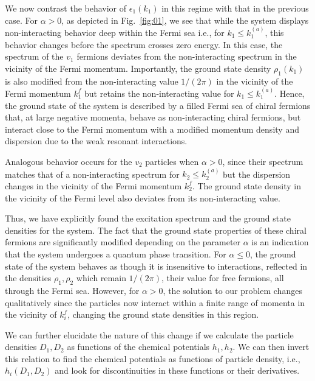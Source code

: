 \documentclass[aps,pra,
superscriptaddress,
reprint,twocolumn,preprintnumbers,
amsmath,amssymb,
nofootinbib]{revtex4-1}
\begin{document}
 
We now contrast the behavior of $\epsilon_1(k_1)$ in this regime with that in the previous case. For $\alpha>0$, as depicted in Fig.~\ref{fig:01}, we see that while the system displays non-interacting behavior deep within the Fermi sea i.e., for $k_1 \leq k_1^{(a)}$, this behavior changes before the spectrum crosses zero energy. In this case, the spectrum of the $v_1$ fermions deviates from the non-interacting spectrum in the vicinity of the Fermi momentum.
Importantly, the ground state density $\rho_1(k_1)$ is also modified from the non-interacting value $1/(2\pi)$ in the vicinity of the Fermi momentum $k_1^f$ but retains the non-interacting value for $k_1 \leq k_1^{(a)}$. Hence, the ground state of the system is described by a filled Fermi sea of chiral fermions that, at large negative momenta, behave as non-interacting chiral fermions, but interact close to the Fermi momentum with a modified momentum density and dispersion due to the weak resonant interactions.

Analogous behavior occurs for the $v_2$ particles when $\alpha > 0$, since their spectrum matches that of a non-interacting spectrum for $k_2 \leq k_2^{(a)}$ but the dispersion changes 
in the vicinity of the Fermi momentum $k_2^f$. The ground state density in the vicinity of the Fermi level also deviates from its non-interacting value.

Thus, we have explicitly found the excitation spectrum and the ground state densities for the system. The fact that the ground state properties of these chiral fermions are significantly modified depending on the parameter $\alpha$ is an indication that the system undergoes a quantum phase transition. For $\alpha \leq 0$, the ground state of the system behaves as though it is insensitive to interactions, reflected in the densities $\rho_1,\rho_2$ which remain $1/(2\pi)$, their value for free fermions, all through the Fermi sea. However, for $\alpha > 0$, the solution to our problem changes qualitatively since the particles now interact within a finite range of momenta in the vicinity of $k_i^f$, changing the ground state densities in this region.
   
We can further elucidate the nature of this change if we calculate the particle densities $D_1,D_2$ as functions of the chemical potentials $h_1,h_2$. We can then invert this relation to find the chemical potentials as functions of particle density, i.e., $h_i(D_1,D_2)$ and look for discontinuities in these functions or their derivatives. 
\end{document}
